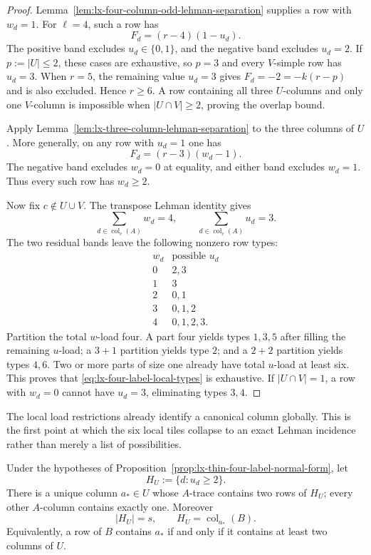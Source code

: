 \begin{proof}
Lemma~\ref{lem:lx-four-column-odd-lehman-separation} supplies a row with
$w_d=1$.  For $\ell=4$, such a row has
\[
 F_d=(r-4)(1-u_d).
\]
The positive band excludes $u_d\in\{0,1\}$, and the negative band excludes
$u_d=2$.  If $p:=|U|\leq2$, these cases are exhaustive, so $p=3$ and every
$V$-simple row has $u_d=3$.  When $r=5$, the remaining value $u_d=3$ gives
$F_d=-2=-k(r-p)$ and is also excluded.  Hence $r\geq6$.  A row containing all
three $U$-columns and only one $V$-column is impossible when
$|U\cap V|\geq2$, proving the overlap bound.

Apply Lemma~\ref{lem:lx-three-column-lehman-separation} to the three columns
of $U$.  More generally, on any row with $u_d=1$ one has
\[
 F_d=(r-3)(w_d-1).
\]
The negative band excludes $w_d=0$ at equality, and either band excludes
$w_d=1$.  Thus every such row has $w_d\geq2$.

Now fix $c\notin U\cup V$.  The transpose Lehman identity gives
\[
 \sum_{d\in\operatorname{col}_c(A)}w_d=4,
 \qquad
 \sum_{d\in\operatorname{col}_c(A)}u_d=3.          \tag{LH-4c}
 \label{eq:lx-four-label-neutral-loads}
\]
The two residual bands leave the following nonzero row types:
\[
\begin{array}{c|c}
 w_d&\text{possible }u_d\\ \hline
 0&2,3\\
 1&3\\
 2&0,1\\
 3&0,1,2\\
 4&0,1,2,3.
\end{array}                                         \tag{LH-4d}
\label{eq:lx-four-label-row-types}
\]
Partition the total $w$-load four.  A part four yields types $1,3,5$ after
filling the remaining $u$-load; a $3+1$ partition yields type $2$; and a
$2+2$ partition yields types $4,6$.  Two or more parts of size one already
have total $u$-load at least six.  This proves that
\eqref{eq:lx-four-label-local-types} is exhaustive.  If $|U\cap V|=1$, a row
with $w_d=0$ cannot have $u_d=3$, eliminating types $3,4$.
\end{proof}

The local load restrictions already identify a canonical column globally.
This is the first point at which the six local tiles collapse to an exact
Lehman incidence rather than merely a list of possibilities.

\begin{proposition}
\label{prop:lx-four-label-heavy-column}
Under the hypotheses of
Proposition~\ref{prop:lx-thin-four-label-normal-form}, let
\[
 H_U:=\{d:u_d\geq2\}.
\]
There is a unique column $a_*\in U$ whose $A$-trace contains two rows of
$H_U$; every other $A$-column contains exactly one.  Moreover
\[
 |H_U|=s,\qquad H_U=\operatorname{col}_{a_*}(B).   \tag{LH-4e}
 \label{eq:lx-four-label-heavy-column}
\]
Equivalently, a row of $B$ contains $a_*$ if and only if it contains at
least two columns of $U$.
\end{proposition}

